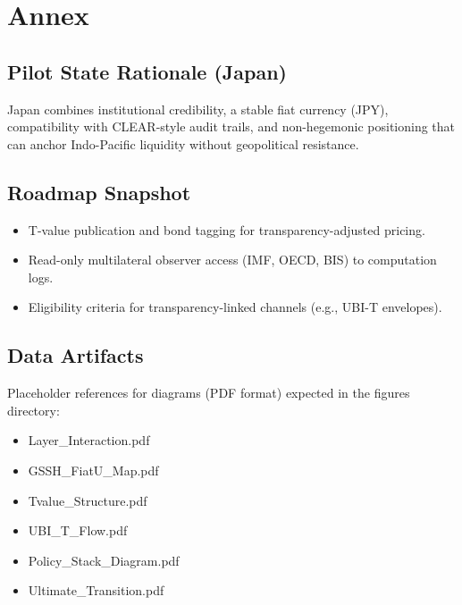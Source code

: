 \section{Annex}
\subsection{Pilot State Rationale (Japan)}
Japan combines institutional credibility, a stable fiat currency (JPY), compatibility with CLEAR-style audit trails, and non-hegemonic positioning that can anchor Indo-Pacific liquidity without geopolitical resistance.

\subsection{Roadmap Snapshot}
\begin{itemize}
  \item T-value publication and bond tagging for transparency-adjusted pricing.
  \item Read-only multilateral observer access (IMF, OECD, BIS) to computation logs.
  \item Eligibility criteria for transparency-linked channels (e.g., UBI-T envelopes).
\end{itemize}

\subsection{Data Artifacts}
Placeholder references for diagrams (PDF format) expected in the figures directory:
\begin{itemize}
  \item Layer\_Interaction.pdf
  \item GSSH\_FiatU\_Map.pdf
  \item Tvalue\_Structure.pdf
  \item UBI\_T\_Flow.pdf
  \item Policy\_Stack\_Diagram.pdf
  \item Ultimate\_Transition.pdf
\end{itemize}
